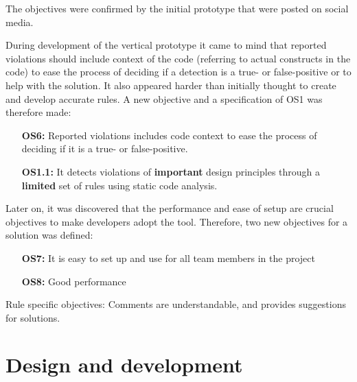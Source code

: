 \documentclass{report}
\begin{document}
The objectives were confirmed by the initial prototype that were posted on social media. 



During development of the vertical prototype it came to mind that reported violations should include context of the code (referring to actual constructs in the code) to ease the process of deciding if a detection is a true- or false-positive or to help with the solution. It also appeared harder than initially thought to create and develop accurate rules. A new objective and a specification of OS1 was therefore made: 


\begin{itemize}
    \item [\textbf{OS6:}] Reported violations includes code context to ease the process of deciding if it is a true- or false-positive. 
    \item [\textbf{OS1.1:}] It detects violations of \textbf{important} design principles through a \textbf{limited} set of rules using static code analysis.
\end{itemize}

Later on, it was discovered that the performance and ease of setup are crucial objectives to make developers adopt the tool. Therefore, two new objectives for a solution was defined:
\begin{itemize}
     \item [\textbf{OS7:}] It is easy to set up and use for all team members in the project
    \item [\textbf{OS8:}] Good performance
\end{itemize}






Rule specific objectives: 
Comments are understandable, and provides suggestions for solutions.

\section{Design and development}
\end{document}
